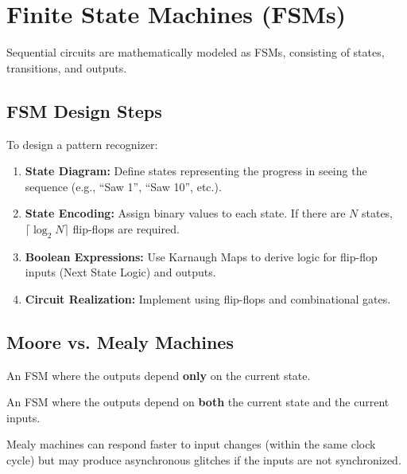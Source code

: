 \section{Finite State Machines (FSMs)}

Sequential circuits are mathematically modeled as FSMs, consisting of states, transitions, and outputs.

\subsection{FSM Design Steps}

\begin{example}
To design a pattern recognizer:

\begin{enumerate}
    \item \textbf{State Diagram:} Define states representing the progress in seeing the sequence (e.g., ``Saw 1'', ``Saw 10'', etc.).
    \item \textbf{State Encoding:} Assign binary values to each state. If there are $N$ states, $\lceil \log_2 N \rceil$ flip-flops are required.
    \item \textbf{Boolean Expressions:} Use Karnaugh Maps to derive logic for flip-flop inputs (Next State Logic) and outputs.
    \item \textbf{Circuit Realization:} Implement using flip-flops and combinational gates.
\end{enumerate}

\end{example}

\subsection{Moore vs. Mealy Machines}

\begin{definition}
An FSM where the outputs depend \textbf{only} on the current state.
\end{definition}

\begin{definition}
An FSM where the outputs depend on \textbf{both} the current state and the current inputs.
\end{definition}

\begin{remark}
Mealy machines can respond faster to input changes (within the same clock cycle) but may produce asynchronous glitches if the inputs are not synchronized.
\end{remark}
